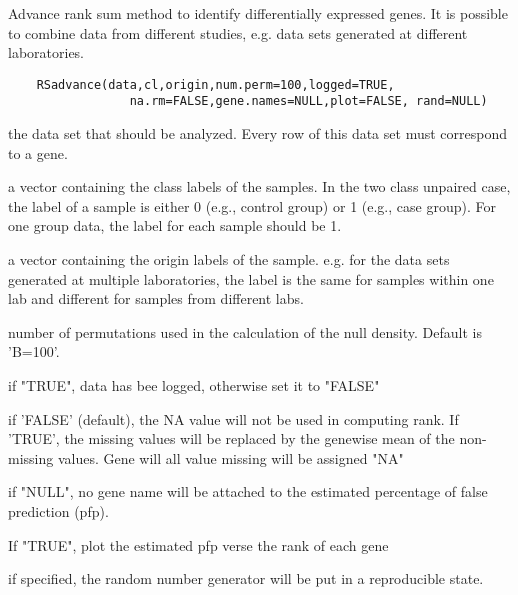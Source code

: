 \begin{Description}\relax
Advance rank sum method to identify differentially 
expressed genes. It is possible to combine data from 
different studies, e.g. data sets generated at different 
laboratories.
\end{Description}
\begin{Usage}
\begin{verbatim}
    RSadvance(data,cl,origin,num.perm=100,logged=TRUE,
                 na.rm=FALSE,gene.names=NULL,plot=FALSE, rand=NULL)
\end{verbatim}
\end{Usage}
\begin{Arguments}
\begin{ldescription}
\item[\code{data}] the data set that should be analyzed. Every 
row of this data set must correspond to a gene.
\item[\code{cl}] a vector containing the class labels of the 
samples. In the two class unpaired case, the label 
of a sample is either 0 (e.g., control group) or 1 
(e.g., case group). For one group data, the label for 
each sample should be 1.
\item[\code{origin}] a vector containing the origin labels of the 
sample. e.g. for 
the data sets generated at multiple laboratories, the label
is the same for samples within one lab and different for samples 
from different labs. 
\item[\code{num.perm}] number of permutations used in the calculation 
of the null density. Default is 'B=100'.
\item[\code{logged}] if "TRUE", data has bee logged, otherwise set 
it to "FALSE"
\item[\code{na.rm}] if 'FALSE' (default), the NA value will not
be used in computing rank. If 'TRUE', the missing 
values will be replaced by the genewise mean of
the non-missing values. Gene will all value missing 
will be assigned "NA"
\item[\code{gene.names}] if "NULL", no gene name will be attached 
to the estimated percentage of false prediction (pfp). 
\item[\code{plot}] If "TRUE", plot the estimated pfp verse the rank 
of each gene
\item[\code{rand}] if specified, the random number generator 
will be put in a  reproducible state.
\end{ldescription}
\end{Arguments}
